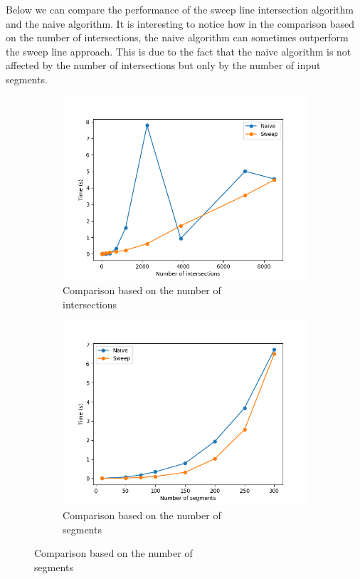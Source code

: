 Below we can compare the performance of the sweep line intersection algorithm and the naive algorithm. It is interesting to notice how in the comparison based on the number of intersections, the naive algorithm can sometimes outperform the sweep line approach. This is due to the fact that the naive algorithm is not affected by the number of intersections but only by the number of input segments.
\begin{figure}[H]
    \begin{subfigure}{0.5\textwidth}
        \centering
        \includegraphics[width=\linewidth]{images/plot_intersections.png}
        \caption{Comparison based on the number of \\intersections}
        \label{fig:intersections}
    \end{subfigure}
    \begin{subfigure}{0.5\textwidth}
        \centering
        \includegraphics[width=\linewidth]{images/plot_segments.png}
        \caption{Comparison based on the number of \\segments}
        \label{fig:segments}
    \end{subfigure}
\end{figure}


